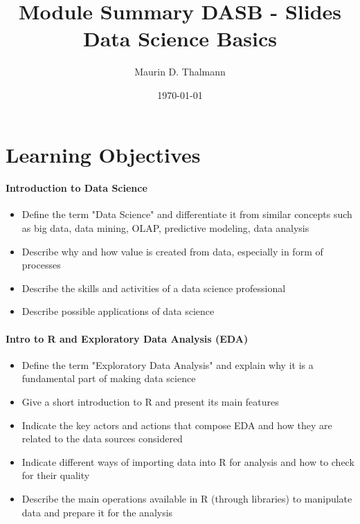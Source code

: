\documentclass[a4paper]{article}
\title{\textbf{Module Summary DASB - Slides} \\
Data Science Basics}
\date{\today}
\author{Maurin D. Thalmann}
\begin{document}
	
	\maketitle
	
	\newpage
	\tableofcontents
	
	\newpage
	
	\section{Learning Objectives}
	
		\paragraph{Introduction to Data Science}
		
			\begin{itemize}
				\item Define the term "Data Science" and differentiate it from similar concepts such as big data, data mining, OLAP, predictive modeling, data analysis
				\item Describe why and how value is created from data, especially in form of processes
				\item Describe the skills and activities of a data science professional
				\item Describe possible applications of data science
			\end{itemize}
		
		\paragraph{Intro to R and Exploratory Data Analysis (EDA)}
		
			\begin{itemize}
				\item Define the term "Exploratory Data Analysis" and explain why it is a fundamental part of making data science
				\item Give a short introduction to R and present its main features
				\item Indicate the key actors and actions that compose EDA and how they are related to the data sources considered
				\item Indicate different ways of importing data into R for analysis and how to check for their quality
				\item Describe the main operations available in R (through libraries) to manipulate data and prepare it for the analysis
			\end{itemize}
		
\end{document}

